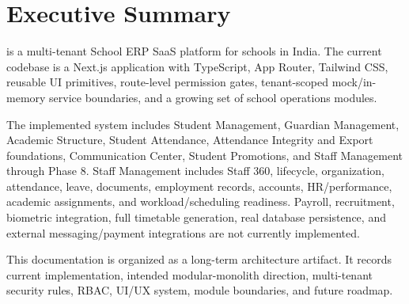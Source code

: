 \chapter*{Executive Summary}
\ProjectName{} is a multi-tenant School ERP SaaS platform for schools in India. The current codebase is a Next.js application with TypeScript, App Router, Tailwind CSS, reusable UI primitives, route-level permission gates, tenant-scoped mock/in-memory service boundaries, and a growing set of school operations modules.

The implemented system includes Student Management, Guardian Management, Academic Structure, Student Attendance, Attendance Integrity and Export foundations, Communication Center, Student Promotions, and Staff Management through Phase 8. Staff Management includes Staff 360, lifecycle, organization, attendance, leave, documents, employment records, accounts, HR/performance, academic assignments, and workload/scheduling readiness. Payroll, recruitment, biometric integration, full timetable generation, real database persistence, and external messaging/payment integrations are not currently implemented.

This documentation is organized as a long-term architecture artifact. It records current implementation, intended modular-monolith direction, multi-tenant security rules, RBAC, UI/UX system, module boundaries, and future roadmap.
